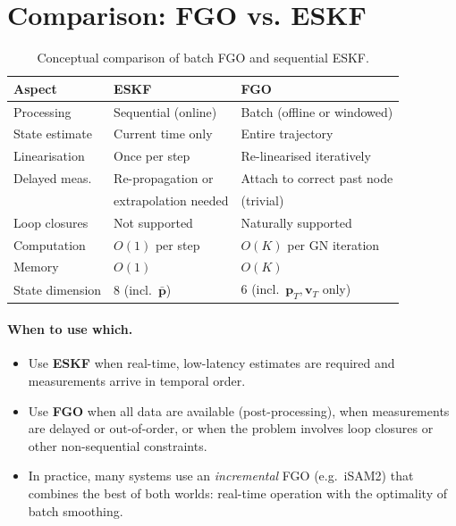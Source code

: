 \documentclass[11pt,a4paper]{article}
\begin{document}
\section{Comparison: FGO vs. ESKF}
\label{sec:comparison}

\begin{table}[htbp]
\centering
\caption{Conceptual comparison of batch FGO and sequential ESKF.}
\label{tab:comparison}
\begin{tabular}{@{}lll@{}}
\toprule
\textbf{Aspect} & \textbf{ESKF} & \textbf{FGO} \\
\midrule
Processing      & Sequential (online)  & Batch (offline or windowed) \\
State estimate  & Current time only    & Entire trajectory \\
Linearisation   & Once per step        & Re-linearised iteratively \\
Delayed meas.   & Re-propagation or    & Attach to correct past node \\
                & extrapolation needed & (trivial) \\
Loop closures   & Not supported        & Naturally supported \\
Computation     & $O(1)$ per step      & $O(K)$ per GN iteration \\
Memory          & $O(1)$               & $O(K)$ \\
State dimension & 8 (incl.\ $\bar{\bm{p}}$) & 6 (incl.\ $\bm{p}_T, \bm{v}_T$ only) \\
\bottomrule
\end{tabular}
\end{table}

\paragraph{When to use which.}
\begin{itemize}[nosep]
  \item Use \textbf{ESKF} when real-time, low-latency estimates are
        required and measurements arrive in temporal order.
  \item Use \textbf{FGO} when all data are available (post-processing),
        when measurements are delayed or out-of-order, or when the
        problem involves loop closures or other non-sequential
        constraints.
  \item In practice, many systems use an \emph{incremental} FGO (e.g.\
        iSAM2) that combines the best of both worlds: real-time
        operation with the optimality of batch smoothing.
\end{itemize}
\end{document}
